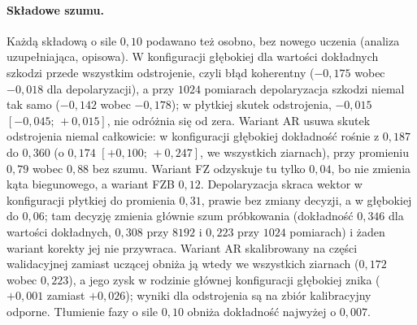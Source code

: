 
\paragraph{Składowe szumu.}
Każdą składową o sile $0{,}10$ podawano też osobno, bez nowego uczenia (analiza uzupełniająca, opisowa).
W konfiguracji głębokiej dla wartości dokładnych szkodzi przede wszystkim odstrojenie, czyli błąd koherentny ($-0{,}175$ wobec $-0{,}018$ dla depolaryzacji), a przy $1024$ pomiarach depolaryzacja szkodzi niemal tak samo ($-0{,}142$ wobec $-0{,}178$); w płytkiej skutek odstrojenia, $-0{,}015$ $[-0{,}045;\,+0{,}015]$, nie odróżnia się od zera.
Wariant AR usuwa skutek odstrojenia niemal całkowicie: w konfiguracji głębokiej dokładność rośnie z $0{,}187$ do $0{,}360$ (o $0{,}174$ $[+0{,}100;\,+0{,}247]$, we wszystkich ziarnach), przy promieniu $0{,}79$ wobec $0{,}88$ bez szumu.
Wariant FZ odzyskuje tu tylko $0{,}04$, bo nie zmienia kąta biegunowego, a wariant FZB $0{,}12$.
Depolaryzacja skraca wektor w konfiguracji płytkiej do promienia $0{,}31$, prawie bez zmiany decyzji, a w głębokiej do $0{,}06$; tam decyzję zmienia głównie szum próbkowania (dokładność $0{,}346$ dla wartości dokładnych, $0{,}308$ przy $8192$ i $0{,}223$ przy $1024$ pomiarach) i żaden wariant korekty jej nie przywraca.
Wariant AR skalibrowany na części walidacyjnej zamiast uczącej obniża ją wtedy we wszystkich ziarnach ($0{,}172$ wobec $0{,}223$), a jego zysk w rodzinie głównej konfiguracji głębokiej znika ($+0{,}001$ zamiast $+0{,}026$); wyniki dla odstrojenia są na zbiór kalibracyjny odporne.
Tłumienie fazy o sile $0{,}10$ obniża dokładność najwyżej o $0{,}007$.
